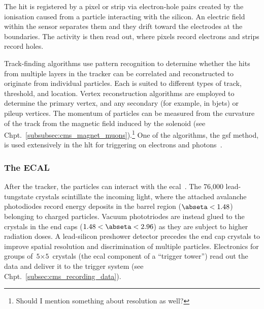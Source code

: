 The hit is registered by a pixel or strip via electron-hole pairs created by the ionisation caused from a particle interacting with the silicon. An electric field within the sensor separates them and they drift toward the electrodes at the boundaries. The activity is then read out, where pixels record electrons and strips record holes.

Track-finding algorithms use pattern recognition to determine whether the hits from multiple layers in the tracker can be correlated and reconstructed to originate from individual particles. Each is suited to different types of track, \pt threshold, and location. Vertex reconstruction algorithms are employed to determine the primary vertex, and any secondary (for example, in \glspl{bjet}) or \gls{pileup} vertices. The momentum of particles can be measured from the curvature of the track from the magnetic field induced by the solenoid (see Chpt.~\ref{subsubsec:cms_magnet_muons}).\footnote{Should I mention something about resolution as well?} One of the algorithms, the \acrfull{gsf} method, is used extensively in the \acrshort{hlt} for triggering on electrons and photons~\cite{Anuar_2015}.




\subsubsection{The ECAL}
\label{subsubsec:cms_ecal}

After the tracker, the particles can interact with the \acrshort{ecal}~\cite{CERN-LHCC-97-033,Bloch:581342}. The 76,000 lead-tungstate crystals scintillate the incoming light, where the attached avalanche photodiodes record energy deposits in the barrel region ($\abseta < \text{1.48}$) belonging to charged particles. Vacuum phototriodes are instead glued to the crystals in the end caps ($\text{1.48} < \abseta < \text{2.96}$) as they are subject to higher radiation doses. A lead-silicon preshower detector precedes the end cap crystals to improve spatial resolution and discrimination of multiple particles. Electronics for groups of $\text{5}\times\text{5}$ crystals (the \acrshort{ecal} component of a ``trigger tower'') read out the data and deliver it to the trigger system (see Chpt.~\ref{subsec:cms_recording_data}).

